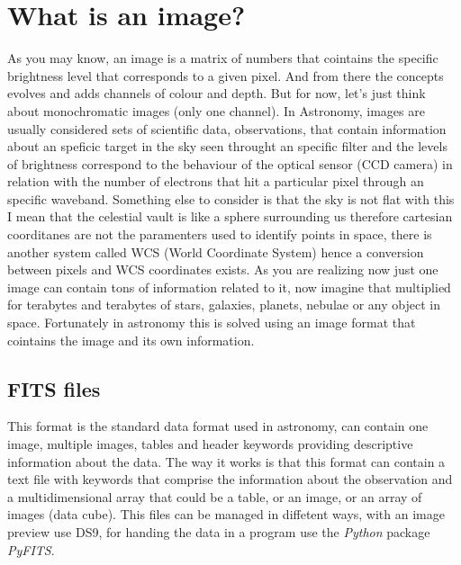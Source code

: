 \documentclass[11pt,fleqn]{book} %
\begin{document}
																																																																																																																																																																\section{What is an image?}
																																																																																																																																																																	As you may know, an image is a matrix of numbers that cointains the specific brightness level that corresponds to a given pixel. And from there the concepts evolves and adds channels of colour and depth. But for now, let's just think about monochromatic images (only one channel). In Astronomy, images are usually considered sets of scientific data, observations, that contain information about an speficic target in the sky seen throught an specific filter and the levels of brightness correspond to the behaviour of the optical sensor (CCD camera) in relation with the number of electrons that hit a particular pixel through an specific waveband. Something else to consider is that the sky is not flat with this I mean that the celestial vault is like a sphere surrounding us therefore cartesian coorditanes are not the paramenters used to identify points in space, there is another system called WCS (World Coordinate System) hence a conversion between pixels and WCS coordinates exists. As you are realizing now just one image can contain tons of information related to it, now imagine that multiplied for terabytes and terabytes of stars, galaxies, planets, nebulae or any object in space. Fortunately in astronomy this is solved using an image format that cointains the image and its own information.
																																																																																																																																																																		\subsection{FITS files}
																																																																																																																																																																		    	This format is the standard data format used in astronomy, can contain one image, multiple images, tables and header keywords providing descriptive information about the data. The way it works is that this format can contain a text file with keywords that comprise the information about the observation and a multidimensional array that could be a table, or an image, or an array of images (data cube). This files can be managed in diffetent ways, with an image preview use DS9, for handing the data in a program use the \emph{Python} package \emph{PyFITS}.
																																																																																																																																																																			        
\end{document}
